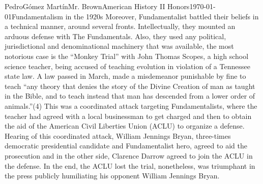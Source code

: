 \documentclass[12pt, letterpaper]{article}
\begin{document}
\begin{mla}{Pedro}{G\'{o}mez Mart\'{i}n}{Mr. Brown}{American History II Honors}{\today}{Fundamentalism in the 1920s}
  Moreover, Fundamentalist battled their beliefs in a technical manner, around several fronts. Intellectually, they mounted an arduous defense with The Fundamentals. Also, they used any political, jurisdictional and denominational machinery that was available, the most notorious case is the “Monkey Trial” with John Thomas Scopes, a high school science teacher, being accused of teaching evolution in violation of a Tennessee state law. A law passed in March, made a misdemeanor punishable by fine to teach “any theory that denies the story of the Divine Creation of man as taught in the Bible, and to teach instead that man has descended from a lower order of animals.”(4) This was a coordinated attack targeting Fundamentalists, where the teacher had agreed with a local businessman to get charged and then to obtain the aid of the American Civil Liberties Union (ACLU) to organize a defense. Hearing of this coordinated attack, William Jennings Bryan, three-times democratic presidential candidate and Fundamentalist hero, agreed to aid the prosecution and in the other side, Clarence Darrow agreed to join the ACLU in the defense. In the end, the ACLU lost the trial, nonetheless, was triumphant in the press publicly humiliating his opponent William Jennings Bryan.\\
\end{mla}
\printbibliography
\end{document}
